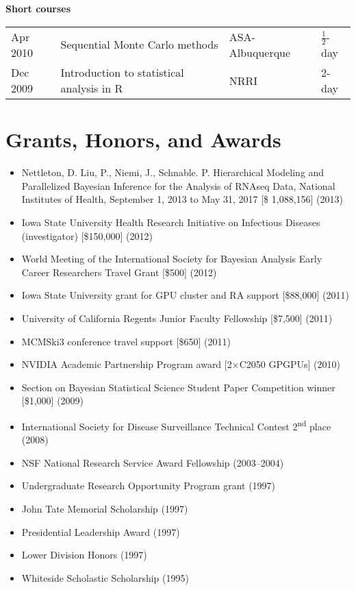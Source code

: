\documentclass[overlapped,line,letterpaper]{res}
\begin{document}
\begin{resume}
{\bf Short courses}

\begin{tabular}{llll}
Apr 2010 & Sequential Monte Carlo methods & ASA-Albuquerque & $\frac{1}{2}$-day \\
Dec 2009 & Introduction to statistical analysis in R & NRRI & 2-day
\end{tabular}


\section{\bf Grants, Honors, and Awards}

\begin{itemize}
\item Nettleton, D. Liu, P., Niemi, J., Schnable. P. Hierarchical Modeling and Parallelized Bayesian Inference for the Analysis of RNAseq Data, National Institutes of Health, September 1, 2013 to May 31, 2017 [\$ 1,088,156] (2013)
\item Iowa State University Health Research Initiative on Infectious Diseases (investigator) [\$150,000] (2012)
\item World Meeting of the International Society for Bayesian Analysis Early Career Researchers Travel Grant [\$500] (2012)
\item Iowa State University grant for GPU cluster and RA support [\$88,000] (2011)
\item University of California Regents Junior Faculty Fellowship [\$7,500] (2011)
\item MCMSki3 conference travel support [\$650] (2011)
\item NVIDIA Academic Partnership Program award [2$\times$C2050 GPGPUs] (2010)
\item Section on Bayesian Statistical Science Student Paper Competition winner [\$1,000] (2009)
\item International Society for Disease Surveillance Technical Contest 2\textsuperscript{nd} place (2008)
\item NSF National Research Service Award Fellowship (2003--2004)
\item Undergraduate Research Opportunity Program grant (1997)
\item John Tate Memorial Scholarship (1997)
\item Presidential Leadership Award (1997)
\item Lower Division Honors (1997)
\item Whiteside Scholastic Scholarship (1995)
\end{itemize}


\end{resume}
\end{document}
